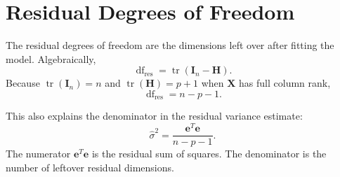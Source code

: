 \section{Residual Degrees of Freedom}

The residual degrees of freedom are the dimensions left over after fitting the model.  Algebraically,
\begin{equation}
  \operatorname{df}_{\mathrm{res}}=\operatorname{tr}(\mathbf{I}_n-\mathbf{H}).
\end{equation}
Because \(\operatorname{tr}(\mathbf{I}_n)=n\) and \(\operatorname{tr}(\mathbf{H})=p+1\) when \(\mathbf{X}\) has full column rank,
\begin{equation}
  \boxed{
  \operatorname{df}_{\mathrm{res}}=n-p-1.
  }
\end{equation}

This also explains the denominator in the residual variance estimate:
\begin{equation}
  \widehat{\sigma}^2=\frac{\mathbf{e}^T\mathbf{e}}{n-p-1}.
\end{equation}
The numerator \(\mathbf{e}^T\mathbf{e}\) is the residual sum of squares.  The denominator is the number of leftover residual dimensions.


